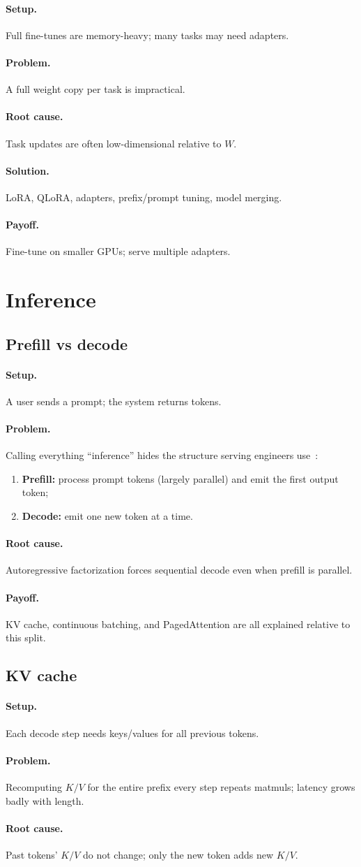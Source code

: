 \documentclass[11pt,a4paper]{article}
\newcommand{\layer}[1]{\paragraph{#1.}}
\newcommand{\setup}{\layer{Setup}}
\newcommand{\problem}{\layer{Problem}}
\newcommand{\rootcause}{\layer{Root cause}}
\newcommand{\solution}{\layer{Solution}}
\newcommand{\payoff}{\layer{Payoff}}
\begin{document}
\setup
Full fine-tunes are memory-heavy; many tasks may need adapters.

\problem
A full weight copy per task is impractical.

\rootcause
Task updates are often low-dimensional relative to \(W\).

\solution
LoRA, QLoRA, adapters, prefix/prompt tuning, model merging.

\payoff
Fine-tune on smaller GPUs; serve multiple adapters.

\section{Inference}
\label{sec:inference}

\subsection{Prefill vs decode}
\label{sec:prefill-decode}

\setup
A user sends a prompt; the system returns tokens.

\problem
Calling everything ``inference'' hides the structure serving engineers use~\cite{vizuara2026paged}:
\begin{enumerate}[leftmargin=*]
  \item \textbf{Prefill:} process prompt tokens (largely parallel) and emit the first output token;
  \item \textbf{Decode:} emit one new token at a time.
\end{enumerate}

\rootcause
Autoregressive factorization forces sequential decode even when prefill is parallel.

\payoff
KV cache, continuous batching, and PagedAttention are all explained relative to this split.

\subsection{KV cache}
\label{sec:kv}

\setup
Each decode step needs keys/values for all previous tokens.

\problem
Recomputing \(K/V\) for the entire prefix every step repeats matmuls; latency grows badly with length.

\rootcause
Past tokens' \(K/V\) do not change; only the new token adds new \(K/V\).
\end{document}
